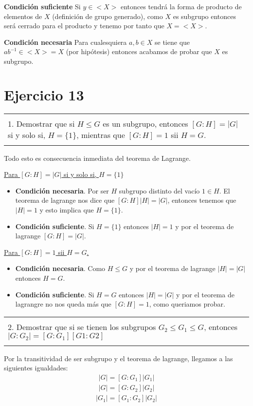 \documentclass[12pt]{article}
\newenvironment{micaja}
{
    \begin{center}
    \begin{tabular}{|p{0.9\textwidth}|}
    \hline\\
    }   
    {   
    \\\\\hline
    \end{tabular} 
    \end{center}
    }
\begin{document}
\textbf{Condición suficiente}
Si $y \in <X>$ entonces tendrá la forma de producto de elementos de $X$ (definición de grupo generado),
 como $X$ es subgrupo entonces será cerrado para el producto y tenemo por tanto que $X = <X>$.

 \textbf{Condición necesaria}
Para cualesquiera $a,b \in X$ se tiene que $ab^{-1} \in <X> = X$ (por hipótesis) entonces acabamos de probar
que $X$ es subgrupo. 
\newpage

\section[Ejercicio 13]{Ejercicio 13}

    \begin{micaja}
    1. Demostrar que si $H \leq G$ es un subgrupo, entonces $[G:H] = |G|$ si y solo si, $H=\{1\}$, mientras que 
    $[G:H]=1$ sii $H=G$.
    \end{micaja}

    Todo esto es consecuencia inmediata del teorema de Lagrange.
    
    
\underline{Para $[G:H] = |G|$ si y solo si, $H=\{1\}$}

    \begin{itemize}
        \item 
   
    \textbf{Condición necesaria}. Por ser $H$ subgrupo distinto del vacío $1\in H$. El teorema de lagrange nos dice 
    que $[G:H] |H| = |G|$, entonces tenemos que $|H|=1$ y esto implica que $H=\{1\}$.

    \item \textbf{Condición suficiente}. Si $H=\{1\}$ entonces $|H|=1$ y por el teorema de lagrange $[G:H] = |G|$.
    \end{itemize}

    \underline{Para $[G:H]=1$ sii $H=G$.}
    \begin{itemize}
    \item \textbf{Condición necesaria}. Como  $H \leq G$ y por el teorema de lagrange $|H| = |G|$ entonces   $H=G$.
    \item\textbf{Condición suficiente}. Si $H=G$ entonces $|H| = |G|$ y por el teorema de lagrangre no nos queda más que $[G:H]=1$, 
    como queriamos probar. 
\end{itemize}   
    \begin{micaja}
    2. Demostrar que si se tienen los subgrupos $G_2 \leq G_1 \leq G$, entonces $|G:G_2| = [G:G_1][G1:G2]$
    \end{micaja}
Por la transitividad de ser subgrupo y el teorema de lagrange, llegamos a las siguientes igualdades:
    \begin{align}
        |G| = [G:G_1] |G_1|
    \end{align}
    \begin{align}
        |G| = [G:G_2] |G_2|
    \end{align}
    \begin{align}
        |G_1| = [G_1:G_2] |G_2|
    \end{align}
\end{document}
